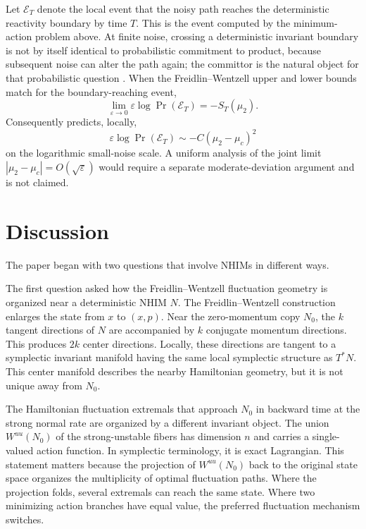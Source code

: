 \documentclass[11pt]{article}
\theoremstyle{definition}
\theoremstyle{remark}
\newcommand{\eps}{\varepsilon}
\begin{document}
Let $\mathcal E_T$ denote the local event that the noisy path reaches the deterministic reactivity boundary by time $T$.  This is the event computed by the minimum-action problem above.  At finite noise, crossing a deterministic invariant boundary is not by itself identical to probabilistic commitment to product, because subsequent noise can alter the path again; the committor is the natural object for that probabilistic question \cite{EVandenEijnden2006,EVandenEijnden2010}.  When the Freidlin--Wentzell upper and lower bounds match for the boundary-reaching event,
\begin{equation}
\lim_{\eps\to0}\eps\log\Pr(\mathcal E_T)=-S_T(\mu_2).
\end{equation}
Consequently  predicts, locally,
\begin{equation}
\eps\log\Pr(\mathcal E_T)
\sim -C(\mu_2-\mu_c)^2
\end{equation}
on the logarithmic small-noise scale.  A uniform analysis of the joint limit $|\mu_2-\mu_c|=O(\sqrt\eps)$ would require a separate moderate-deviation argument and is not claimed.

\section{Discussion}
\label{sec:discussion}

The paper began with two questions that involve NHIMs in different ways.

The first question asked how the Freidlin--Wentzell fluctuation geometry is organized near a deterministic NHIM $N$.  The Freidlin--Wentzell construction enlarges the state from $x$ to $(x,p)$.  Near the zero-momentum copy $N_0$, the $k$ tangent directions of $N$ are accompanied by $k$ conjugate momentum directions.  This produces $2k$ center directions.  Locally, these directions are tangent to a symplectic invariant manifold having the same local symplectic structure as $T^*N$.  This center manifold describes the nearby Hamiltonian geometry, but it is not unique away from $N_0$.

The Hamiltonian fluctuation extremals that approach $N_0$ in backward time at the strong normal rate are organized by a different invariant object.  The union $W^{uu}(N_0)$ of the strong-unstable fibers has dimension $n$ and carries a single-valued action function.  In symplectic terminology, it is exact Lagrangian.  This statement matters because the projection of $W^{uu}(N_0)$ back to the original state space organizes the multiplicity of optimal fluctuation paths.  Where the projection folds, several extremals can reach the same state.  Where two minimizing action branches have equal value, the preferred fluctuation mechanism switches.
\end{document}
